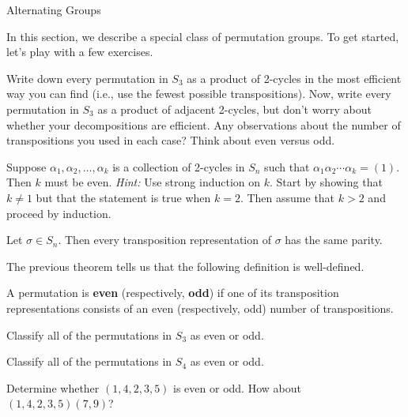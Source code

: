 \begin{section}{Alternating Groups}

In this section, we describe a special class of permutation groups.  To get started, let's play with a few exercises.

\begin{exercise}
Write down every permutation in $S_3$ as a product of 2-cycles in the most efficient way you can find (i.e., use the fewest possible transpositions).  Now, write every permutation in $S_3$ as a product of adjacent 2-cycles, but don't worry about whether your decompositions are efficient.  Any observations about the number of transpositions you used in each case?  Think about even versus odd.
\end{exercise}

\begin{lemma}
Suppose $\alpha_1,\alpha_2,\ldots,\alpha_k$ is a collection of 2-cycles in $S_n$ such that $\alpha_1\alpha_2\cdots\alpha_k=(1)$.  Then $k$ must be even.  \emph{Hint:} Use strong induction on $k$. Start by showing that $k\neq 1$ but that the statement is true when $k=2$. Then assume that $k>2$ and proceed by induction.
\end{lemma}

\begin{theorem}
Let $\sigma\in S_n$.  Then every transposition representation of $\sigma$ has the same parity.
\end{theorem}

The previous theorem tells us that the following definition is well-defined.

\begin{definition}
A permutation is \textbf{even} (respectively, \textbf{odd}) if one of its transposition representations consists of an even (respectively, odd) number of transpositions.
\end{definition}

\begin{exercise}
Classify all of the permutations in $S_3$ as even or odd.
\end{exercise}

\begin{exercise}
Classify all of the permutations in $S_4$ as even or odd.
\end{exercise}

\begin{exercise}
Determine whether $(1,4,2,3,5)$ is even or odd.  How about $(1,4,2,3,5)(7,9)$?
\end{exercise}


\end{section}
